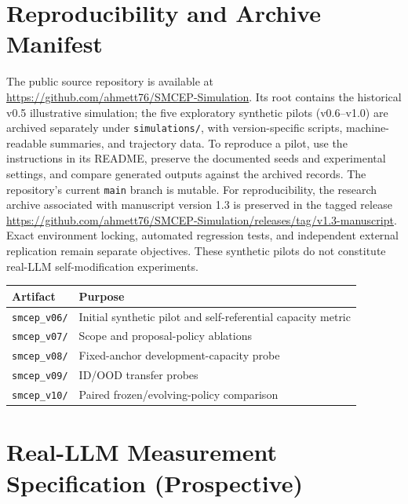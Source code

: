 \documentclass[11pt,a4paper]{article}
\begin{document}
\section{Reproducibility and Archive Manifest}
The public source repository is available at \url{https://github.com/ahmett76/SMCEP-Simulation}. Its root contains the historical v0.5 illustrative simulation; the five exploratory synthetic pilots (v0.6--v1.0) are archived separately under \texttt{simulations/}, with version-specific scripts, machine-readable summaries, and trajectory data. To reproduce a pilot, use the instructions in its README, preserve the documented seeds and experimental settings, and compare generated outputs against the archived records. The repository's current \texttt{main} branch is mutable.
For reproducibility, the research archive associated with manuscript version 1.3 is preserved in the
tagged release \url{https://github.com/ahmett76/SMCEP-Simulation/releases/tag/v1.3-manuscript}. Exact environment locking, automated regression tests, and independent external replication remain separate objectives. These synthetic pilots do not constitute real-LLM self-modification experiments.
\begin{center}\small
\begin{tabularx}{\linewidth}{@{}l X@{}}\toprule
Artifact & Purpose \\\midrule
\texttt{smcep\_v06/} & Initial synthetic pilot and self-referential capacity metric \\
\texttt{smcep\_v07/} & Scope and proposal-policy ablations \\
\texttt{smcep\_v08/} & Fixed-anchor development-capacity probe \\
\texttt{smcep\_v09/} & ID/OOD transfer probes \\
\texttt{smcep\_v10/} & Paired frozen/evolving-policy comparison \\\bottomrule
\end{tabularx}
\end{center}

\section{Real-LLM Measurement Specification (Prospective)}
\end{document}
